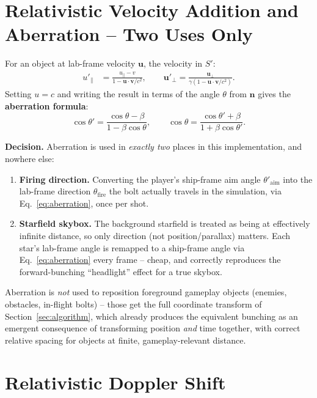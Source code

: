 \documentclass[11pt]{article}
\newcommand{\vb}[1]{\mathbf{#1}}
\newcommand{\uv}[1]{\hat{\mathbf{#1}}}
\newcommand{\pperp}{{\perp}}
\newcommand{\ppar}{{\parallel}}
\newcommand{\decision}[1]{\par\smallskip\noindent\textbf{Decision.} #1\par\smallskip}
\begin{document}
\section{Relativistic Velocity Addition and Aberration -- Two Uses Only}
\label{sec:aberration}

For an object at lab-frame velocity $\vb u$, the velocity in $S'$:
\begin{align}
  u'_\ppar &= \frac{u_\ppar - v}{1 - \vb u\cdot\vb v/c^2}, \qquad
  \vb u'_\pperp = \frac{\vb u_\pperp}{\gamma\left(1 - \vb u\cdot\vb v/c^2\right)}.
\end{align}
Setting $u=c$ and writing the result in terms of the angle $\theta$ from $\uv n$ gives the \textbf{aberration formula}:
\begin{equation}
  \cos\theta' = \frac{\cos\theta - \beta}{1-\beta\cos\theta}, \qquad
  \cos\theta = \frac{\cos\theta' + \beta}{1+\beta\cos\theta'}.
  \label{eq:aberration}
\end{equation}

\decision{Aberration is used in \emph{exactly two} places in this implementation, and nowhere else:
\begin{enumerate}[leftmargin=1.5em]
  \item \textbf{Firing direction.} Converting the player's ship-frame aim angle $\theta'_{\text{aim}}$ into the lab-frame direction $\theta_{\text{fire}}$ the bolt actually travels in the simulation, via Eq.~\eqref{eq:aberration}, once per shot.
  \item \textbf{Starfield skybox.} The background starfield is treated as being at effectively infinite distance, so only direction (not position/parallax) matters. Each star's lab-frame angle is remapped to a ship-frame angle via Eq.~\eqref{eq:aberration} every frame -- cheap, and correctly reproduces the forward-bunching ``headlight'' effect for a true skybox.
\end{enumerate}
Aberration is \emph{not} used to reposition foreground gameplay objects (enemies, obstacles, in-flight bolts) -- those get the full coordinate transform of Section~\ref{sec:algorithm}, which already produces the equivalent bunching as an emergent consequence of transforming position \emph{and} time together, with correct relative spacing for objects at finite, gameplay-relevant distance.}

\section{Relativistic Doppler Shift}
\label{sec:doppler}
\end{document}
